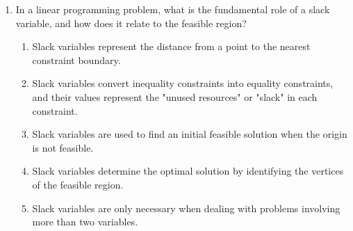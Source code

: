 \documentclass{article}%
\begin{document}
\begin{enumerate}
\begin{enumerate}
\begin{enumerate}%
\item 12%
\item 0%
\item 7%
\item 5%
\item 35%
\end{enumerate}%
\vspace{0.5em}%
\item Which variable would enter the basis in the first iteration of the simplex method?%
\begin{enumerate}%
\item $s_1$%
\item $s_2$%
\item $x_1$%
\item $x_2$%
\item None, the solution is optimal.%
\end{enumerate}%
\vspace{0.5em}%
\item What is the maximum value of $x_2$ allowed by the constraints, given that $x_1 = 0$?%
\begin{enumerate}%
\item 7%
\item 5%
\item 2%
\item 0%
\item 1%
\end{enumerate}%
\vspace{0.5em}%
\end{enumerate}%
\item In a linear programming problem, what is the fundamental role of a slack variable, and how does it relate to the feasible region?%
\begin{enumerate}%
\item Slack variables represent the distance from a point to the nearest constraint boundary.%
\item Slack variables convert inequality constraints into equality constraints, and their values represent the "unused resources" or "slack" in each constraint.%
\item Slack variables are used to find an initial feasible solution when the origin is not feasible.%
\item Slack variables determine the optimal solution by identifying the vertices of the feasible region.%
\item Slack variables are only necessary when dealing with problems involving more than two variables.%

\end{enumerate}
\end{enumerate}
\end{document}
